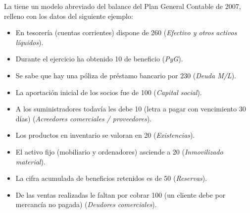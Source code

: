 \documentclass[nochap,palatino,shortheader]{apuntes}
\begin{document}
La  tiene un modelo abreviado del balance del Plan General Contable de 2007, relleno con los datos del siguiente ejemplo:

\begin{itemize}
\item En tesorería (cuentas corrientes) dispone de 260 (\textit{Efectivo y otros activos líquidos}).
\item Durante el ejercicio ha obtenido 10 de beneficio (\textit{PyG}).
\item Se sabe que hay una póliza de préstamo bancario por 230 (\textit{Deuda M/L}).
\item La aportación inicial de los socios fue de 100 (\textit{Capital social}).
\item A los suministradores todavía les debe 10 (letra a pagar con vencimiento 30 días) (\textit{Acreedores comerciales / proveedores}).
\item Los productos en inventario se valoran en 20 (\textit{Existencias}).
\item El activo fijo (mobiliario y ordenadores) asciende a 20 (\textit{Inmovilizado material}).
\item La cifra acumulada de beneficios retenidos es de 50 (\textit{Reservas}).
\item De las ventas realizadas le faltan por cobrar 100 (un cliente debe por mercancía no pagada) (\textit{Deudores comerciales}).
\end{itemize}
\end{document}
